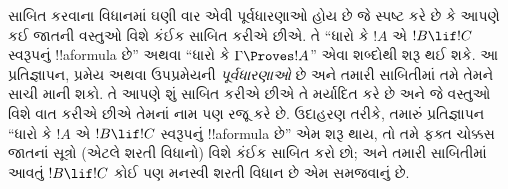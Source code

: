 \documentclass[../../../include/open-logic-section]{subfiles}
\begin{document}
સાબિત કરવાના વિધાનમાં ઘણી વાર એવી પૂર્વધારણાઓ હોય છે જે સ્પષ્ટ કરે
છે કે આપણે કઈ જાતની વસ્તુઓ વિશે કંઈક સાબિત કરીએ છીએ. તે ``ધારો કે
$!A$ એ $!B \lif !C$ સ્વરૂપનું !!a{formula} છે'' અથવા ``ધારો કે
$\Gamma \Proves !A$'' એવા શબ્દોથી શરૂ થઈ શકે. આ પ્રતિજ્ઞાપન,
પ્રમેય અથવા ઉપપ્રમેયની \emph{પૂર્વધારણાઓ} છે અને તમારી સાબિતીમાં તમે
તેમને સાચી માની શકો. તે આપણે શું સાબિત કરીએ છીએ તે મર્યાદિત કરે
છે અને જે વસ્તુઓ વિશે વાત કરીએ છીએ તેમનાં નામ પણ રજૂ કરે છે.
ઉદાહરણ તરીકે, તમારું પ્રતિજ્ઞાપન ``ધારો કે $!A$ એ $!B \lif !C$
સ્વરૂપનું !!a{formula} છે'' એમ શરૂ થાય, તો તમે ફક્ત ચોક્કસ જાતનાં
સૂત્રો (એટલે શરતી વિધાનો) વિશે કંઈક સાબિત કરો છો; અને તમારી
સાબિતીમાં આવતું $!B \lif !C$ કોઈ પણ મનસ્વી શરતી વિધાન છે એમ
સમજવાનું છે.
\end{document}

